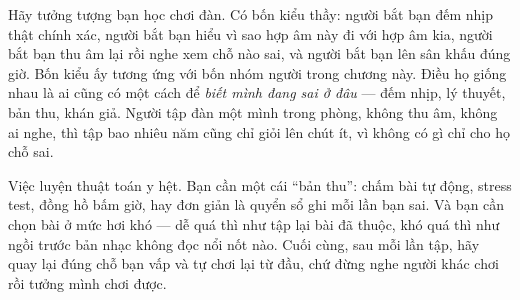 \documentclass[../../algorithm.tex]{subfiles}
\begin{document}
\begin{dongian}
Hãy tưởng tượng bạn học chơi đàn. Có bốn kiểu thầy: người bắt bạn đếm nhịp thật chính xác, người bắt bạn hiểu vì sao hợp âm này đi với hợp âm kia, người bắt bạn thu âm lại rồi nghe xem chỗ nào sai, và người bắt bạn lên sân khấu đúng giờ. Bốn kiểu ấy tương ứng với bốn nhóm người trong chương này. Điều họ giống nhau là ai cũng có một cách để \emph{biết mình đang sai ở đâu} --- đếm nhịp, lý thuyết, bản thu, khán giả. Người tập đàn một mình trong phòng, không thu âm, không ai nghe, thì tập bao nhiêu năm cũng chỉ giỏi lên chút ít, vì không có gì chỉ cho họ chỗ sai.

Việc luyện thuật toán y hệt. Bạn cần một cái ``bản thu'': chấm bài tự động, stress test, đồng hồ bấm giờ, hay đơn giản là quyển sổ ghi mỗi lần bạn sai. Và bạn cần chọn bài ở mức hơi khó --- dễ quá thì như tập lại bài đã thuộc, khó quá thì như ngồi trước bản nhạc không đọc nổi nốt nào. Cuối cùng, sau mỗi lần tập, hãy quay lại đúng chỗ bạn vấp và tự chơi lại từ đầu, chứ đừng nghe người khác chơi rồi tưởng mình chơi được.
\end{dongian}
\end{document}

